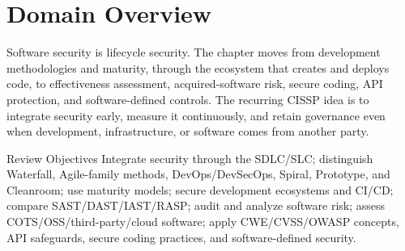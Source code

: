 \documentclass[10pt,letterpaper]{article}
\begin{document}
\makecornelltitle

\section*{Domain Overview}
Software security is lifecycle security. The chapter moves from development methodologies and maturity, through the ecosystem that creates and deploys code, to effectiveness assessment, acquired-software risk, secure coding, API protection, and software-defined controls. The recurring CISSP idea is to integrate security early, measure it continuously, and retain governance even when development, infrastructure, or software comes from another party.

\begin{summarybox}{Review Objectives}
Integrate security through the SDLC/SLC; distinguish Waterfall, Agile-family methods, DevOps/DevSecOps, Spiral, Prototype, and Cleanroom; use maturity models; secure development ecosystems and CI/CD; compare SAST/DAST/IAST/RASP; audit and analyze software risk; assess COTS/OSS/third-party/cloud software; apply CWE/CVSS/OWASP concepts, API safeguards, secure coding practices, and software-defined security.
\end{summarybox}
\end{document}
